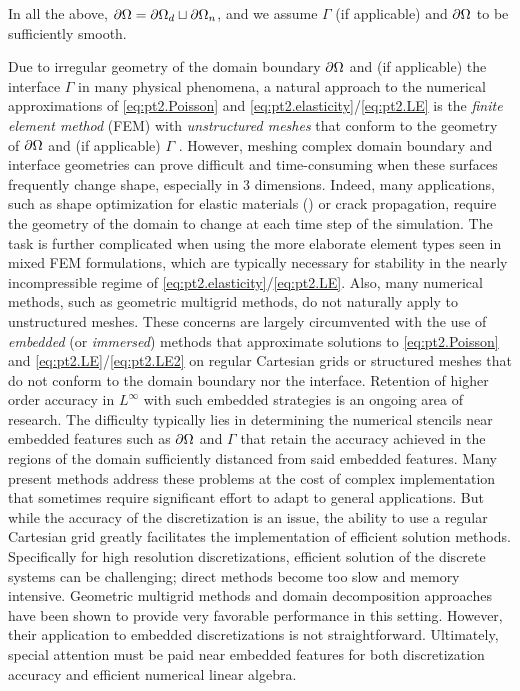 In all the above, $\partial\Omega = \partial\Omega_d \sqcup \partial\Omega_n$, and we assume $\Gamma$ (if applicable) and $\partial\Omega$ to be sufficiently smooth.

Due to irregular geometry of the domain boundary $\partial\Omega$ and (if applicable) the interface $\Gamma$ in many physical phenomena, a natural approach to the numerical approximations of \eqref{eq:pt2.Poisson} and \eqref{eq:pt2.elasticity}/\eqref{eq:pt2.LE} is the \emph{finite element method} (FEM) with \emph{unstructured meshes} that conform to the geometry of $\partial\Omega$ and (if applicable) $\Gamma$ \cite{Babuska70, Bramble96, Chen.Zhiming96, Dryja05, Cockburn09, Wohlmuth99, Huang02, Lamichhane04}. However, meshing complex domain boundary and interface geometries can prove difficult and time-consuming when these surfaces frequently change shape, especially in $3$ dimensions. Indeed, many applications, such as shape optimization for elastic materials (\cite{Sethian00, Osher01, Allaire04, Duysinx06, Challis08, Wei.Peng08}) or crack propagation, require the geometry of the domain to change at each time step of the simulation. The task is further complicated when using the more elaborate element types seen in mixed FEM formulations, which are typically necessary for stability in the nearly incompressible regime of \eqref{eq:pt2.elasticity}/\eqref{eq:pt2.LE}. Also, many numerical methods, such as geometric multigrid methods, do not naturally apply to unstructured meshes. These concerns are largely circumvented with the use of \emph{embedded} (or \emph{immersed}) methods that approximate solutions to \eqref{eq:pt2.Poisson} and \eqref{eq:pt2.LE}/\eqref{eq:pt2.LE2} on regular Cartesian grids or structured meshes that do not conform to the domain boundary nor the interface. Retention of higher order accuracy in $L^{\infty}$ with such embedded strategies is an ongoing area of research. The difficulty typically lies in determining the numerical stencils near embedded features such as $\partial\Omega$ and $\Gamma$ that retain the accuracy achieved in the regions of the domain sufficiently distanced from said embedded features. Many present methods address these problems at the cost of complex implementation that sometimes require significant effort to adapt to general applications. But while the accuracy of the discretization is an issue, the ability to use a regular Cartesian grid greatly facilitates the implementation of efficient solution methods. Specifically for high resolution discretizations, efficient solution of the discrete systems can be challenging; direct methods become too slow and memory intensive. Geometric multigrid methods and domain decomposition approaches have been shown to provide very favorable performance in this setting. However, their application to embedded discretizations is not straightforward. Ultimately, special attention must be paid near embedded features for both discretization accuracy and efficient numerical linear algebra.


